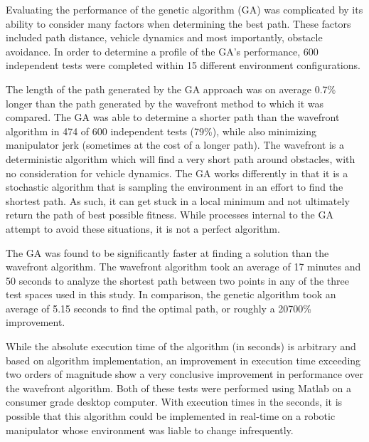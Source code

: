 %
Evaluating the performance of the genetic algorithm (GA) was complicated by its ability to consider many factors when determining the best path. These factors included path distance, vehicle dynamics and most importantly, obstacle avoidance. In order to determine a profile of the GA's performance, 600 independent tests were completed within 15 different environment configurations.

The length of the path generated by the GA approach was on average 0.7\% longer than the path generated by the wavefront method to which it was compared. The GA was able to determine a shorter path than the wavefront algorithm in 474 of 600 independent tests (79\%), while also minimizing manipulator jerk (sometimes at the cost of a longer path). The wavefront is a deterministic algorithm which will find a very short path around obstacles, with no consideration for vehicle dynamics. The GA works differently in that it is a stochastic algorithm that is sampling the environment in an effort to find the shortest path. As such, it can get stuck in a local minimum and not ultimately return the path of best possible fitness. While processes internal to the GA attempt to avoid these situations, it is not a perfect algorithm.

The GA was found to be significantly faster at finding a solution than the wavefront algorithm. The wavefront algorithm took an average of 17 minutes and 50 seconds to analyze the shortest path between two points in any of the three test spaces used in this study. In comparison, the genetic algorithm took an average of 5.15 seconds to find the optimal path, or roughly a 20700\% improvement.

While the absolute execution time of the algorithm (in seconds) is arbitrary and based on algorithm implementation, an improvement in execution time exceeding two orders of magnitude show a very conclusive improvement in performance over the wavefront algorithm. Both of these tests were performed using Matlab on a consumer grade desktop computer. With execution times in the seconds, it is possible that this algorithm could be implemented in real-time on a robotic manipulator whose environment was liable to change infrequently.

